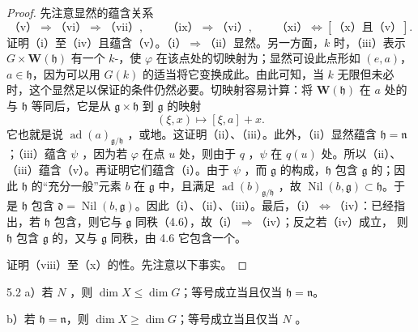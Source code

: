 \begin{proof}
先注意显然的蕴含关系
\[\text{（v）}\Rightarrow\text{（vi）}\Rightarrow\text{（vii）},\qquad
\text{（ix）}\Rightarrow\text{（vi）},\qquad
\text{（xi）}\Leftrightarrow[\text{（x）且（v）}].\]
证明（i）至（iv）且蕴含（v）。（i）$\Rightarrow$（ii）显然。另一方面，$k$ 时，（iii）表示 $G\times\mathbf W(\mathfrak h)$ 有一个 $k$-，使 $\varphi$ 在该点处的切映射为；显然可设此点形如 $(e,a)$，$a\in\mathfrak h$，因为可以用 $G(k)$ 的适当将它变换成此。由此可知，当 $k$ 无限但未必时，这个显然足以保证的条件仍然必要。切映射容易计算：将 $\mathbf W(\mathfrak h)$ 在 $a$ 处的与 $\mathfrak h$ 等同后，它是从 $\mathfrak g\times\mathfrak h$ 到 $\mathfrak g$ 的映射
\[(\xi,x)\longmapsto[\xi,a]+x.\]
它也就是说 $\operatorname{ad}(a)_{\mathfrak g/\mathfrak h}$ ，或地。这证明（ii）、（iii）。此外，（ii）显然蕴含 $\mathfrak h=\mathfrak n$；（iii）蕴含 $\psi$ ，因为若 $\varphi$ 在点 $u$ 处，则由于 $q$ ，$\psi$ 在 $q(u)$ 处。所以（ii）、（iii）蕴含（v）。再证明它们蕴含（i）。由于 $\psi$ ，而 $\mathfrak g$ 的构成，$\mathfrak h$ 包含 $\mathfrak g$ 的；因此 $\mathfrak h$ 的“充分一般”元素 $b$ 在 $\mathfrak g$ 中，且满足 $\operatorname{ad}(b)_{\mathfrak g/\mathfrak h}$ ，故 $\operatorname{Nil}(b,\mathfrak g)\subset\mathfrak h$。于是 $\mathfrak h$ 包含 $\mathfrak d=\operatorname{Nil}(b,\mathfrak g)$。因此（i）、（ii）、（iii）。最后，（i）$\Leftrightarrow$（iv）：已经指出，若 $\mathfrak h$ 包含，则它与 $\mathfrak g$ 同秩（4.6），故（i）$\Rightarrow$（iv）；反之若（iv）成立，
则 $\mathfrak h$ 包含 $\mathfrak g$ 的，又与 $\mathfrak g$ 同秩，由 4.6 它包含一个。

证明（viii）至（x）的性。先注意以下事实。
\end{proof}
\begin{SGAresult}{}{5.2}
 a）若 $N$ ，则 $\dim X\leq\dim G$；等号成立当且仅当 $\mathfrak h=\mathfrak n$。

 b）若 $\mathfrak h=\mathfrak n$，则 $\dim X\geq\dim G$；等号成立当且仅当 $N$ 。
\end{SGAresult}
